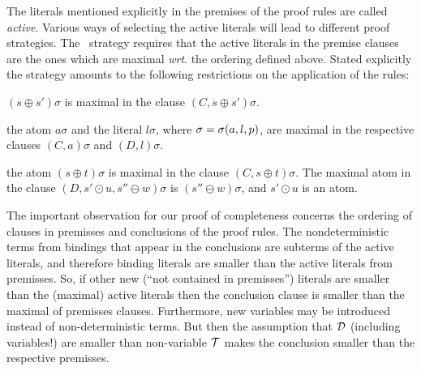 The literals mentioned explicitly in the premises of the proof rules are
called {\em active}. Various ways of selecting the active literals will lead
to different proof strategies. The \strategy\ strategy requires that the
active literals in the premise clauses are the ones which are maximal {\it
wrt}. the ordering defined above.  Stated explicitly the strategy amounts to
the following restrictions on the application of the rules:
\begin{description}\smallerspaces
\item[Reflexivity resolution:] \((s\oplus s')\sigma\) is maximal
in the clause \((C,s\oplus s')\sigma\).
\item [Superposition:] the atom \(a\sigma\) and the literal \(l\sigma\),
where \(\sigma=\sigma(a,l,p)\), are maximal in the respective clauses
\((C,a)\sigma\) and \((D,l)\sigma\).
\item [Compositionality resolution:] the atom \((s\oplus t)\sigma\) is maximal
in the clause \((C,s\oplus t )\sigma\). The maximal atom in the clause
\((D, s'\odot u, s''\ominus w)\sigma\) is \((s''\ominus w)\sigma\), and
\(s'\odot u\) is an atom.
\end{description}
%
The important observation for our proof of completeness concerns the ordering of
clauses in premisses and conclusions of the proof rules.  The
nondeterministic terms from bindings that appear in the conclusions are subterms
of the active literals, and therefore binding literals are smaller than
the active literals from premisses.  So, if other new (``not contained
in premisses'') literals are smaller than the (maximal) active literals
then the conclusion clause is smaller than the maximal of premisses clauses.
Furthermore, new variables may be introduced instead of non-deterministic terms.
But then the assumption that ${\cal D}$ (including variables!) 
are smaller than non-variable ${\cal T}$ makes the conclusion smaller than the 
respective premisses.
%
%
%
